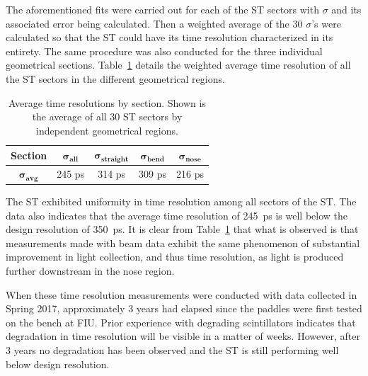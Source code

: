 The aforementioned fits were carried out for each of the ST sectors with $\sigma$ and its associated error being calculated.  Then a weighted average of the 30 $\sigma$'s were calculated so that the ST could have its time resolution characterized in its entirety.  The same procedure was also conducted for the three individual geometrical sections.  Table~\ref{tab:time_res_section} details the weighted average time resolution of all the ST sectors in the different geometrical regions.
	\begin{table}[htbp]
		\centering
		\begin{tabular}{|c|c|c|c|c|}
			\hline  \textbf{Section} & $\mathbf{\sigma_{all}}$ & $\mathbf{\sigma_{straight}}$ & $\mathbf{\sigma_{bend}}$ & $\mathbf{\sigma_{nose}}$ \\ 
			\hline $\mathbf{\sigma_{avg}}$ & 245 ps & 314 ps & 309 ps & 216 ps \\ 
			\hline 
		\end{tabular}
		\caption{Average time resolutions by section. Shown is the average of all 30 ST sectors by independent geometrical regions.}
		\label{tab:time_res_section}
	\end{table}

The ST exhibited uniformity in time resolution among all sectors of the ST. The data also indicates that the average time resolution of 245~ps is well below the design resolution of 350~ps.  It is clear from Table~\ref{tab:time_res_section} that what is observed is that measurements made with beam data exhibit the same phenomenon of substantial improvement in light collection, and thus time resolution, as light is produced further downstream in the nose region.

When these time resolution measurements were conducted with data collected in Spring 2017, approximately 3 years had elapsed since the paddles were first tested on the bench at FIU.  Prior experience with degrading scintillators indicates that degradation in time resolution will be visible in a matter of weeks.  However, after 3 years no degradation has been observed and the ST is still performing well below design resolution.